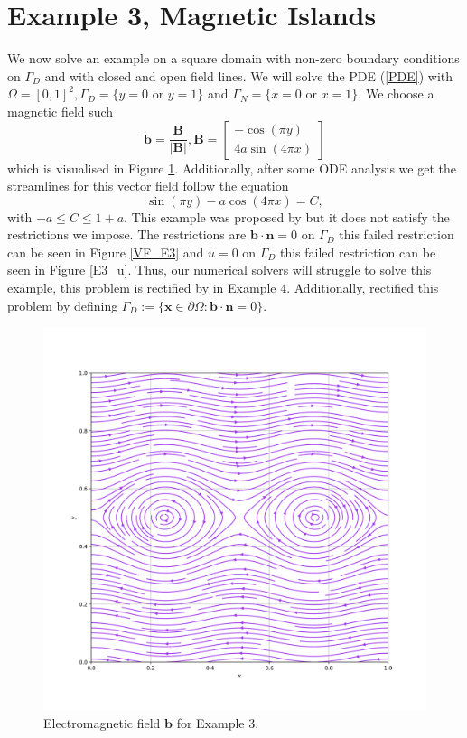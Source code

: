 \documentclass[12pt]{ociamthesis}
\begin{document}
\section{Example 3, Magnetic Islands}
We now solve an example on a square domain with non-zero boundary conditions on $\Gamma_D$ and with closed and open field lines. We will solve the PDE (\ref{PDE}) with $\Omega = [0,1]^2, \Gamma_D = \{y=0 \text{ or } y=1\}$ and $\Gamma_N = \{x=0 \text{ or } x=1\}$. We choose a magnetic field such 
\begin{equation}
\mathbf{b} = \frac{\mathbf{B}}{|\mathbf{B}|}, 
\mathbf{B} = \left[ \begin{matrix}
-\cos(\pi y)\\
4a \sin(4 \pi x)
\end{matrix} \right]
\end{equation}
which is visualised in Figure \ref{E3_VF}. Additionally, after some ODE analysis we get the streamlines for this vector field follow the equation
\begin{equation}
\sin(\pi y)-a\cos(4\pi x) = C,
\end{equation}
with $-a\leq C \leq 1+a$. This example was proposed by \cite{DN} but it does not satisfy the restrictions we impose. The restrictions are $\mathbf{b} \cdot \mathbf{n} = 0$ on $\Gamma_D$ this failed restriction can be seen in Figure \ref{VF_E3} and $u = 0$ on $\Gamma_D$ this failed restriction can be seen in Figure \ref{E3_u}. Thus, our numerical solvers will struggle to solve this example, this problem is rectified by in Example $4$. Additionally, \cite{DN} rectified this problem by defining $\Gamma_D := \{\mathbf{x} \in \partial \Omega :  \mathbf{b} \cdot \mathbf{n} = 0\}$.
\begin{figure}[H]
 \includegraphics[width=\textwidth]{Pics/VectorField/E3b.png}
  \caption{Electromagnetic field $\mathbf{b}$ for Example $3$.}
 \label{E3_VF}
\end{figure}
\end{document}
